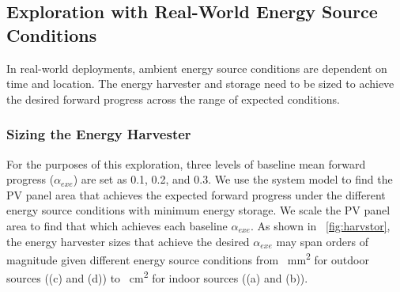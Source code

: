 
\subsection{Exploration with Real-World Energy Source Conditions} \label{subsec:harvstor}


In real-world deployments, ambient energy source conditions are dependent on time and location. The energy harvester and storage need to be sized to achieve the desired forward progress across the range of expected conditions. 

\subsubsection{Sizing the Energy Harvester}

For the purposes of this exploration, three levels of baseline mean forward progress ($\alpha_{exe}$) are set as 0.1, 0.2, and 0.3. We use the system model to find the PV panel area that achieves the expected forward progress under the different energy source conditions with minimum energy storage. We scale the PV panel area to find that which achieves each baseline $\alpha_{exe}$. As shown in \figurename{~\ref{fig:harvstor}}, the energy harvester sizes that achieve the desired $\alpha_{exe}$ may span orders of magnitude given different energy source conditions from \SI{}{\square\milli\meter} for outdoor sources ((c) and (d)) to \SI{}{\square\centi\meter} for indoor sources ((a) and (b)). 

